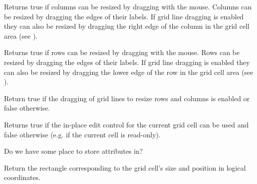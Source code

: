 Returns true if columns can be resized by dragging with the mouse. Columns can be resized
by dragging the edges of their labels. If grid line dragging is enabled they can also be
resized by dragging the right edge of the column in the grid cell area
(see ).



\label{wxgridcandragrowsize}


Returns true if rows can be resized by dragging with the mouse. Rows can be resized
by dragging the edges of their labels. If grid line dragging is enabled they can also be
resized by dragging the lower edge of the row in the grid cell area
(see ).



\label{wxgridcandraggridsize}


Return true if the dragging of grid lines to resize rows and columns is enabled or false otherwise.



\label{wxgridcanenablecellcontrol}


Returns true if the in-place edit control for the current grid cell can be used and
false otherwise (e.g. if the current cell is read-only).



\label{wxgridcanhaveattributes}


Do we have some place to store attributes in?



\label{wxgridcelltorect}



Return the rectangle corresponding to the grid cell's size and position in logical
coordinates.



